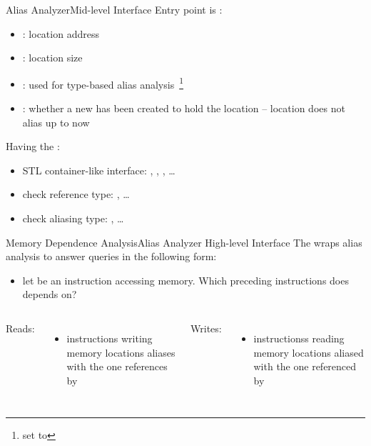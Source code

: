 \documentclass[10pt,mathserif]{beamer}
\begin{document}
\begin{frame}{Alias Analyzer}{Mid-level Interface}
Entry point is :

\begin{itemize}
\item {}: location address
\item {}: location size
\item {}: used for type-based alias
      analysis~\footnote{set to }
\item {}: whether a new  has been
      created to hold the location -- location does not alias up to now
\end{itemize}

\vfill
Having the :

\begin{itemize}
\item STL container-like interface: , ,
      , \ldots
\item check reference type: , \ldots
\item check aliasing type: , \ldots
\end{itemize}
\end{frame}

\begin{frame}{Memory Dependence Analysis}{Alias Analyzer High-level Interface}
The  wraps alias analysis to answer
queries in the following form:

\begin{itemize}
\item let  be an instruction accessing memory. Which
      preceding instructions does  depends on?
\end{itemize}

\vfill
\begin{columns}[t]
Reads:

\begin{itemize}
\item {} instructions writing memory locations aliases with
      the one references by 
\end{itemize}

Writes:

\begin{itemize}
\item {} instructionss reading memory locations aliased with
      the one referenced by 
\end{itemize}
\end{columns}
\end{frame}
\end{document}
